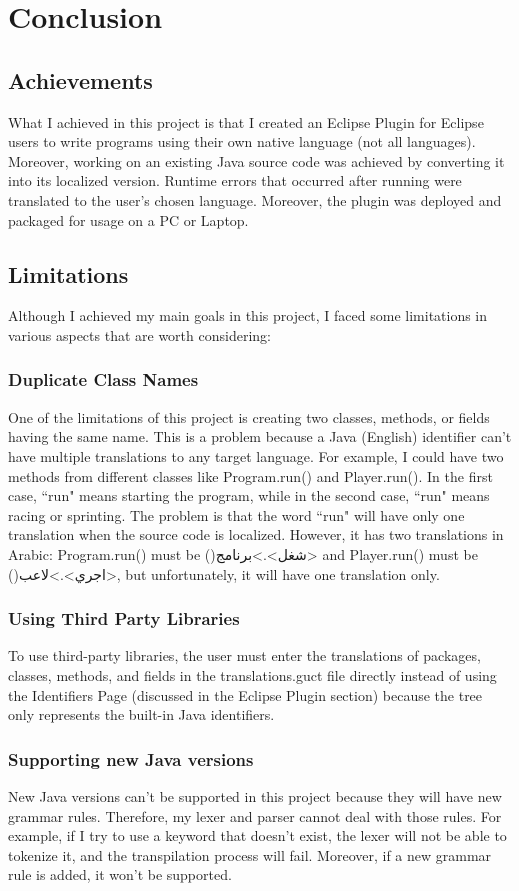 \chapter{Conclusion}
\section{Achievements}
What I achieved in this project is that I created an Eclipse Plugin for Eclipse users to write programs using their own native language (not all languages). Moreover, working on an existing Java source code was achieved by converting it into its localized version. Runtime errors that occurred after running were translated to the user's chosen language. Moreover, the plugin was deployed and packaged for usage on a \ac{PC} or Laptop.
\section{Limitations}
Although I achieved my main goals in this project, I faced some limitations in various aspects that are worth considering:
\subsection{Duplicate Class Names}
One of the limitations of this project is creating two classes, methods, or fields having the same name. This is a problem because a Java (English) identifier can't have multiple translations to any target language. For example, I could have two methods from different classes like Program.run() and Player.run(). In the first case, ``run" means starting the program, while in the second case, ``run" means racing or sprinting. The problem is that the word ``run" will have only one translation when the source code is localized. However, it has two translations in Arabic: Program.run() must be ()\<شغل>\<.>\<برنامج> and Player.run() must be ()\<اجري>\<.>\<لاعب>, but unfortunately, it will have one translation only.
\subsection{Using Third Party Libraries} 
To use third-party libraries, the user must enter the translations of packages, classes, methods, and fields in the translations.guct file directly instead of using the Identifiers Page (discussed in the Eclipse Plugin section) because the tree only represents the built-in Java identifiers.
\subsection{Supporting new Java versions}
New Java versions can't be supported in this project because they will have new grammar rules. Therefore, my lexer and parser cannot deal with those rules. For example, if I try to use a keyword that doesn't exist, the lexer will not be able to tokenize it, and the transpilation process will fail. Moreover, if a new grammar rule is added, it won't be supported. 
